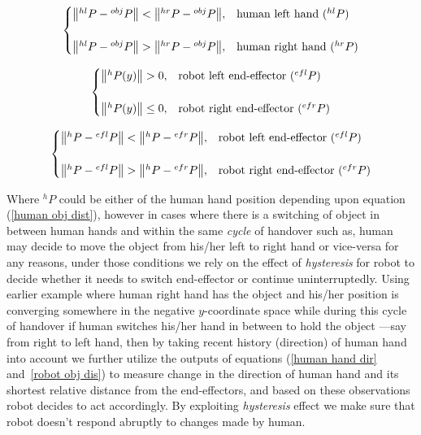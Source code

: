 \begin{equation}\label{human obj dist}
\centering
\begin{cases}
	\norm{{}^{hl}{P} - {}^{obj}{P}} < \norm{{}^{hr}{P} - {}^{obj}{P}}, & \text{human left hand (${}^{hl}{P}$)}  \\
	\\
	\norm{{}^{hl}{P} - {}^{obj}{P}} > \norm{{}^{hr}{P} - {}^{obj}{P}}, & \text{human right hand (${}^{hr}{P}$)}
\end{cases}         
\end{equation}


\begin{equation}\label{human hand dir}
\centering
\begin{cases}
\norm{{}^{h}{P}(y)} > 0,  &  \text{robot left end-effector (${}^{efl}{P}$)} \\
\\
\norm{{}^{h}{P}(y)} \leq 0,  &  \text{robot right end-effector (${}^{efr}{P}$)}
\end{cases}         
\end{equation}

\begin{equation}\label{robot obj dis}
\centering
\begin{cases}
\norm{{}^{h}{P} - {}^{efl}{P}} < \norm{{}^{h}{P} - {}^{efr}{P}}, &  \text{robot left end-effector (${}^{efl}{P}$)} \\
\\
\norm{{}^{h}{P} - {}^{efl}{P}} > \norm{{}^{h}{P} - {}^{efr}{P}}, &  \text{robot right end-effector (${}^{efr}{P}$)}
\end{cases}
\end{equation}


Where ${}^{h}{P}$ could be either of the human hand position depending upon equation (\ref{human obj dist}), however in cases where there is a switching of object in between human hands and within the same \textit{cycle} of handover such as, human may decide to move the object from his/her left to right hand or vice-versa for any reasons, under those conditions we rely on the effect of \textit{hysteresis} for robot to decide whether it needs to switch end-effector or continue uninterruptedly. Using earlier example where human right hand has the object and his/her position is converging somewhere in the negative $y$-coordinate space while during this cycle of handover if human switches his/her hand in between to hold the object ---say from right to left hand, then by taking recent history (direction) of human hand into account we further utilize the outputs of equations (\ref{human hand dir} and~\ref{robot obj dis}) to measure change in the direction of human hand and its shortest relative distance from the end-effectors, and based on these observations robot decides to act accordingly. By exploiting \textit{hysteresis} effect we make sure that robot doesn't respond abruptly to changes made by human.

